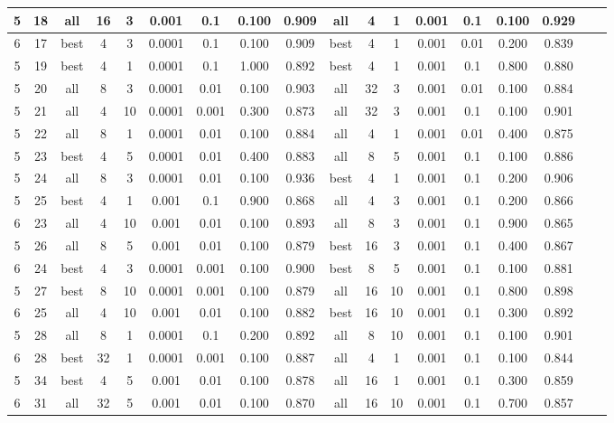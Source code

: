 \begin{table*}[!h]
\begin{tabular}{|c|c||c|c|c|c|c|c|c||c|c|c|c|c|c|c|c|c|}
5 & 18 & all & 16 & 3 & 0.001 & 0.1 & 0.100 & 0.909 &all & 4 & 1 & 0.001 & 0.1 & 0.100 & 0.929 \\ \hline
6 & 17 & best & 4 & 3 & 0.0001 & 0.1 & 0.100 & 0.909 &best & 4 & 1 & 0.001 & 0.01 & 0.200 & 0.839 \\ \hline
5 & 19 & best & 4 & 1 & 0.0001 & 0.1 & 1.000 & 0.892 &best & 4 & 1 & 0.001 & 0.1 & 0.800 & 0.880 \\ \hline
5 & 20 & all & 8 & 3 & 0.0001 & 0.01 & 0.100 & 0.903 &all & 32 & 3 & 0.001 & 0.01 & 0.100 & 0.884 \\ \hline
5 & 21 & all & 4 & 10 & 0.0001 & 0.001 & 0.300 & 0.873 &all & 32 & 3 & 0.001 & 0.1 & 0.100 & 0.901 \\ \hline
5 & 22 & all & 8 & 1 & 0.0001 & 0.01 & 0.100 & 0.884 &all & 4 & 1 & 0.001 & 0.01 & 0.400 & 0.875 \\ \hline
5 & 23 & best & 4 & 5 & 0.0001 & 0.01 & 0.400 & 0.883 &all & 8 & 5 & 0.001 & 0.1 & 0.100 & 0.886 \\ \hline
5 & 24 & all & 8 & 3 & 0.0001 & 0.01 & 0.100 & 0.936 &best & 4 & 1 & 0.001 & 0.1 & 0.200 & 0.906 \\ \hline
5 & 25 & best & 4 & 1 & 0.001 & 0.1 & 0.900 & 0.868 &all & 4 & 3 & 0.001 & 0.1 & 0.200 & 0.866 \\ \hline
6 & 23 & all & 4 & 10 & 0.001 & 0.01 & 0.100 & 0.893 &all & 8 & 3 & 0.001 & 0.1 & 0.900 & 0.865 \\ \hline
5 & 26 & all & 8 & 5 & 0.001 & 0.01 & 0.100 & 0.879 &best & 16 & 3 & 0.001 & 0.1 & 0.400 & 0.867 \\ \hline
6 & 24 & best & 4 & 3 & 0.0001 & 0.001 & 0.100 & 0.900 &best & 8 & 5 & 0.001 & 0.1 & 0.100 & 0.881 \\ \hline
5 & 27 & best & 8 & 10 & 0.0001 & 0.001 & 0.100 & 0.879 &all & 16 & 10 & 0.001 & 0.1 & 0.800 & 0.898 \\ \hline
6 & 25 & all & 4 & 10 & 0.001 & 0.01 & 0.100 & 0.882 &best & 16 & 10 & 0.001 & 0.1 & 0.300 & 0.892 \\ \hline
5 & 28 & all & 8 & 1 & 0.0001 & 0.1 & 0.200 & 0.892 &all & 8 & 10 & 0.001 & 0.1 & 0.100 & 0.901 \\ \hline
6 & 28 & best & 32 & 1 & 0.0001 & 0.001 & 0.100 & 0.887 &all & 4 & 1 & 0.001 & 0.1 & 0.100 & 0.844 \\ \hline
5 & 34 & best & 4 & 5 & 0.001 & 0.01 & 0.100 & 0.878 &all & 16 & 1 & 0.001 & 0.1 & 0.300 & 0.859 \\ \hline
6 & 31 & all & 32 & 5 & 0.001 & 0.01 & 0.100 & 0.870 &all & 16 & 10 & 0.001 & 0.1 & 0.700 & 0.857 \\ \hline

\end{tabular}
\end{table*}
